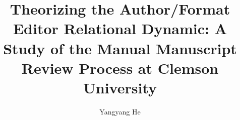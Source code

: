 \documentclass[10pt]{ClemsonThesis}
\title{Theorizing the Author/Format Editor Relational Dynamic:  A Study
       of the Manual Manuscript Review Process at Clemson University}
\author{Yangyang He}
\begin{document}
    \frontmatter %

    \maketitle          %
    \singlespacing                             %
     \clearpage
    \tableofcontents \clearpage                %
    
    \doublespacing %
	
	\mainmatter %

    
    \setcounter{page}{1}
    
    
    
    
    
    

    \begin{appendices}
        \begin{subappendices}
        \end{subappendices}
    \end{appendices}



    \singlespacing                             %
\end{document}
